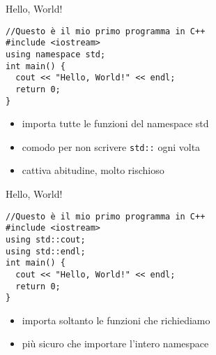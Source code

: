 \documentclass[xcolor=dvipsnames,handout]{beamer}
\begin{document}
\begin{frame}[fragile]{Hello, World!}
  \vfill
  \begin{lstlisting}
//Questo è il mio primo programma in C++
#include <iostream>
using namespace std;
int main() {
  cout << "Hello, World!" << endl;
  return 0;
}
  \end{lstlisting}
  \vfill
  \begin{itemize}
    \item importa \alert{tutte} le funzioni del namespace std
    \vfill
    \item comodo per non scrivere \lstinline$std::$ ogni volta
    \vfill
    \item cattiva abitudine, molto rischioso
  \end{itemize}
  \vfill
\end{frame}

\begin{frame}[fragile]{Hello, World!}
  \vfill
  \begin{lstlisting}
//Questo è il mio primo programma in C++
#include <iostream>
using std::cout;
using std::endl;
int main() {
  cout << "Hello, World!" << endl;
  return 0;
}
  \end{lstlisting}
  \vfill
  \begin{itemize}
    \item importa soltanto le funzioni che richiediamo
    \vfill
    \item più sicuro che importare l'intero namespace
  \end{itemize}
  \vfill
\end{frame}
\end{document}

